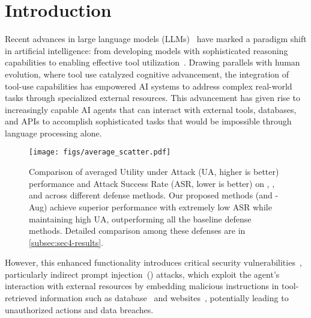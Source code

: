 \section{Introduction}
\label{sec:intro}

Recent advances in large language models (LLMs)~\cite{achiam2023gpt, anthropic_tool_use, team2023gemini, llama_tool_use} have marked a paradigm shift in artificial intelligence: from developing models with sophisticated reasoning capabilities to enabling effective tool utilization~\cite{yao2022webshop, anthropic_tool_use, openai_tool_use, llama_tool_use}. 
Drawing parallels with human evolution, where tool use catalyzed cognitive advancement, the integration of tool-use capabilities has empowered AI systems to address complex real-world tasks through specialized external resources. 
This advancement has given rise to increasingly capable AI agents that can interact with external tools, databases, and APIs to accomplish sophisticated tasks that would be impossible through language processing alone.


\begin{figure}[t!]
    \centering
    \texttt{[image: figs/average\_scatter.pdf]}
    \vspace{-.2in}
    \caption{Comparison of averaged Utility under Attack (UA, higher is better) performance and Attack Success Rate (ASR, lower is better) on \gpt, \othree, and \llama across different defense methods. %
    Our proposed methods (\method and \method-Aug) achieve superior performance with extremely low ASR while maintaining high UA, outperforming all the baseline defense methods. Detailed comparison among these defenses are in \cref{subsec:sec4-results}.}
    \vspace{-.2in}
    \label{fig: defense_performance}
\end{figure}


However, this enhanced functionality introduces critical security vulnerabilities~\cite{naihin2023testing, ruan2024identifying, yuan2024rjudge, liu2024formalizing, zhan24injecagent, debenedetti2024agentdojo, zhang2024agent}, particularly indirect prompt injection~(\ipi) attacks, which exploit the agent's interaction with external resources by embedding malicious instructions in tool-retrieved information such as database~\cite{zhong-etal-2023-poisoning, zou2024poisonedrag, chen2024agentpoison, lee2024prompt} and websites~\cite{liao2024eia, xu2024advweb, wu2024agentattack}, potentially leading to unauthorized actions and data breaches. 


